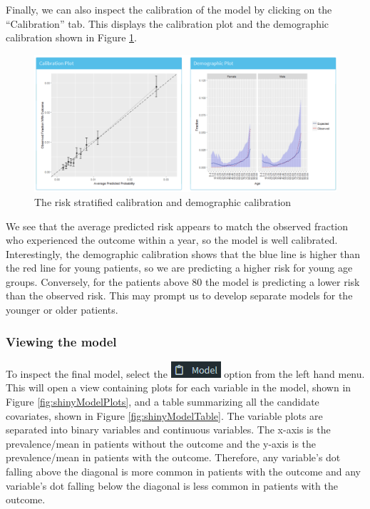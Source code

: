 \documentclass[11pt]{book}
\theoremstyle{definition}
\theoremstyle{definition}
\theoremstyle{definition}
\theoremstyle{remark}
\begin{document}
Finally, we can also inspect the calibration of the model by clicking on the ``Calibration'' tab. This displays the calibration plot and the demographic calibration shown in Figure \ref{fig:shinyPerformanceCal}.

\begin{figure}

{\centering \includegraphics[width=1\linewidth]{images/PatientLevelPrediction/shiny/shinyPerformanceCal} 

}

\caption{The risk stratified calibration and demographic calibration}\label{fig:shinyPerformanceCal}
\end{figure}

We see that the average predicted risk appears to match the observed fraction who experienced the outcome within a year, so the model is well calibrated. Interestingly, the demographic calibration shows that the blue line is higher than the red line for young patients, so we are predicting a higher risk for young age groups. Conversely, for the patients above 80 the model is predicting a lower risk than the observed risk. This may prompt us to develop separate models for the younger or older patients.

\hypertarget{viewing-the-model}{%
\subsubsection*{Viewing the model}\label{viewing-the-model}}

To inspect the final model, select the \includegraphics{images/PatientLevelPrediction/modelButton.png} option from the left hand menu. This will open a view containing plots for each variable in the model, shown in Figure \ref{fig:shinyModelPlots}, and a table summarizing all the candidate covariates, shown in Figure \ref{fig:shinyModelTable}. The variable plots are separated into binary variables and continuous variables. The x-axis is the prevalence/mean in patients without the outcome and the y-axis is the prevalence/mean in patients with the outcome. Therefore, any variable's dot falling above the diagonal is more common in patients with the outcome and any variable's dot falling below the diagonal is less common in patients with the outcome.
\end{document}
